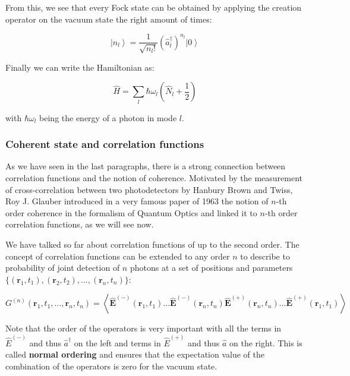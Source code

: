 \noindent From this, we see that every Fock state can be obtained by applying the creation operator on the vacuum state the right amount of times:

\begin{equation}
    \left|n_{l}\right\rangle=\frac{1}{\sqrt{n_{l} !}}\left(\hat{a}_{l}^{\dagger}\right)^{n_{l}}\left|0\right\rangle
\end{equation}


\noindent Finally we can write the Hamiltonian as:

\begin{equation}
    \hat{H}=\sum_{l} \hbar \omega_{l}\left(\hat{N}_{l}+\frac{1}{2}\right)
\end{equation}

\noindent with $\hbar \omega_l$ being the energy of a photon in mode $l$.

\subsubsection{Coherent state and correlation functions}

As we have seen in the last paragraphs, there is a strong connection between correlation functions and the notion of coherence. Motivated by the measurement of cross-correlation between two photodetectors by Hanbury Brown and Twiss, Roy J. Glauber introduced in a very famous paper of 1963 \cite{glauber1963quantum} the notion of $n$-th order coherence in the formalism of Quantum Optics and linked it to $n$-th order correlation functions, as we will see now.

We have talked so far about correlation functions of up to the second order. The concept of correlation functions can be extended to any order $n$ to describe to probability of joint detection of $n$ photons at a set of positions and parameters $\{(\bm{r}_1,t_1),(\bm{r}_2,t_2),...,(\bm{r}_n,t_n)\}$: 

\begin{equation}
    G^{(n)}\left(\bm{r}_{1}, t_{1}, ... , \bm{r}_{n}, t_{n}\right)=\left\langle \hat{\bm{E}}^{(-)}\left(\bm{r}_{1}, t_{1}\right) ... \hat{\bm{E}}^{(-)}\left(\bm{r}_{n}, t_{n}\right) \hat{\bm{E}}^{(+)}\left(\bm{r}_{n}, t_{n}\right) ... \hat{\bm{E}}^{(+)}\left(\bm{r}_{1}, t_{1}\right)\right\rangle
\end{equation}

\label{sec:normal_order}
\noindent Note that the order of the operators is very important with all the terms in $\hat{E}^{(-)}$ and thus $\hat{a}^{\dagger}$ on the left and terms in $\hat{E}^{(+)}$ and thus $\hat{a}$ on the right. This is called \textbf{normal ordering} and ensures that the expectation value of the combination of the operators is zero for the vacuum state. 

